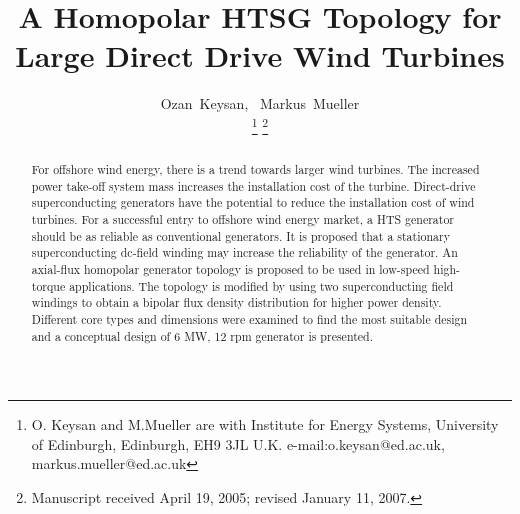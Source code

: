 \documentclass[final,peerreview,onecolumn]{IEEEtran}
\begin{document}
\setcounter{page}{1}

%
\title{A Homopolar HTSG Topology for Large Direct Drive Wind Turbines}
 
 
 \author{Ozan~Keysan,~
         Markus~Mueller%

\thanks{O. Keysan and M.Mueller are with Institute for Energy Systems,
University of Edinburgh, Edinburgh, EH9 3JL U.K.
e-mail:o.keysan@ed.ac.uk, markus.mueller@ed.ac.uk}%
\thanks{Manuscript received April 19, 2005; revised January 11, 2007.}}

\IEEEpeerreviewmaketitle

\begin{abstract}

For offshore wind energy, there is a trend  towards larger wind turbines. The increased power take-off system mass increases the installation cost of the turbine. Direct-drive superconducting generators have the potential to reduce the installation cost of wind turbines. For a successful entry to offshore wind energy market, a HTS generator should be as reliable as conventional generators. It is proposed that a stationary superconducting dc-field winding may increase the reliability of the generator. An axial-flux homopolar generator topology is proposed to be used in low-speed high-torque applications. The topology is modified by using two superconducting field windings to obtain a bipolar flux density distribution for higher power density. Different core types and dimensions were examined to find the most suitable design and a conceptual design of 6 MW, 12 rpm generator is presented.


\end{abstract}
\end{document}
